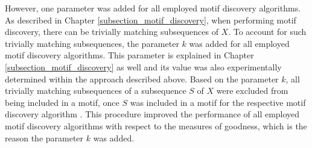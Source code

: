 However, one parameter was added for all employed motif discovery algorithms. As described in Chapter \ref{subsection_motif_discovery}, when performing motif discovery, there can be trivially matching subsequences of $X$. To account for such trivially matching subsequences, the parameter $k$ was added for all employed motif discovery algorithms. This parameter is explained in Chapter \ref{subsection_motif_discovery} as well and its value was also experimentally determined within the approach described above. Based on the parameter $k$, all trivially matching subsequences of a subsequence $S$ of $X$ were excluded from being included in a motif, once $S$ was included in a motif for the respective motif discovery algorithm \cite{Random_Projection}. This procedure improved the performance of all employed motif discovery algorithms with respect to the measures of goodness, which is the reason the parameter $k$ was added.
